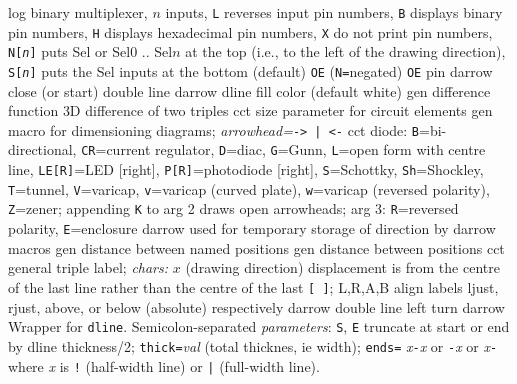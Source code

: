   {log}
  {binary multiplexer, $n$ inputs,
    {\tt L} reverses input pin numbers,
    {\tt B} displays binary pin numbers,
    {\tt H} displays hexadecimal pin numbers,
    {\tt X} do not print pin numbers,
    {\tt N[{\sl n}]} puts Sel or Sel$0$ .. Sel$n$ at the top
    (i.e., to the left of the drawing direction),
    {\tt S[{\sl n}]} puts the Sel inputs at the bottom (default)
    {\tt OE} ({\tt N=}negated) {\tt OE} pin
    }
  {darrow}
  {close (or start) double line}
  {darrow}
  {dline fill color (default white)}
  {gen}
  {difference function}
  {3D}
  {difference of two triples}
  {cct}
  {size parameter for circuit elements }
  {gen}
  {macro for dimensioning diagrams;
      {\sl arrowhead=}{\tt -> | <-}}
  {cct}
  {diode:
   {\tt B}=bi-directional,
   {\tt CR}=current regulator,
   {\tt D}=diac,
   {\tt G}=Gunn,
   {\tt L}=open form with centre line,
   {\tt LE[R]}=LED [right],
   {\tt P[R]}=photodiode [right],
   {\tt S}=Schottky,
   {\tt Sh}=Shockley,
   {\tt T}=tunnel,
   {\tt V}=varicap,
   {\tt v}=varicap (curved plate),
   {\tt w}=varicap (reversed polarity),
   {\tt Z}=zener;
   appending {\tt K} to arg 2 draws open arrowheads;
   arg 3: {\tt R}=reversed polarity, {\tt E}=enclosure }
  {darrow}
  {used for temporary storage of direction by darrow macros}
  {gen}
  {distance between named positions}
  {gen}
  {distance between positions}
  {cct}
  {general triple label; {\sl chars:}
    $x$ (drawing direction) displacement is from the centre of the last
      line rather than the centre of the last {\tt [ ]};
    L,R,A,B align labels ljust, rjust, above,
      or below (absolute) respectively  }
  {darrow}
  {double line left turn}
  {darrow}
  {Wrapper for {\tt dline}.
  Semicolon-separated {\sl parameters}:
    {\tt S}, {\tt E} truncate at start or end by dline thickness/2;
    {\tt thick=}{\sl val}   (total thicknes, ie width);
    {\tt ends=}
      {\sl x}{\tt -}{\sl x} or
      {\tt -}{\sl x} or
      {\sl x}{\tt -} where {\sl x} is {\tt !} (half-width line)
       or {\tt |} (full-width line).}
